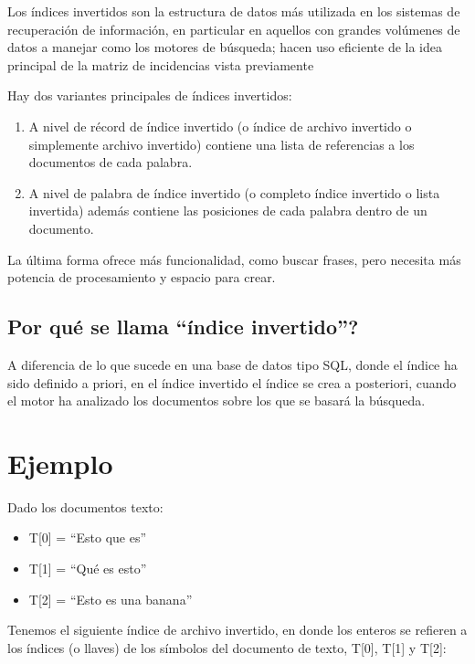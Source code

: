 \documentclass{article}
\begin{document}
Los índices invertidos son la estructura de datos más utilizada en los sistemas de recuperación de información, en particular en aquellos con grandes volúmenes de datos a manejar como los motores de búsqueda; hacen uso eficiente de la idea principal de la matriz de incidencias vista previamente
\newline

Hay dos variantes principales de índices invertidos: \cite{knuth1997art}

\begin{enumerate}
\item A nivel de récord de índice invertido ﻿(o ﻿índice de archivo invertido ﻿o simplemente ﻿archivo invertido﻿) contiene una lista de referencias a los documentos de cada palabra. 
\item A nivel de palabra de índice invertido ﻿(o ﻿completo índice invertido ﻿o ﻿lista invertida﻿) además contiene las posiciones de cada palabra dentro de un documento.  \cite{baeza1999modern}
\end{enumerate}
La última forma ofrece más funcionalidad, como buscar frases, pero necesita más potencia de procesamiento y espacio para crear. \cite{luk2007efficient}

\subsection{Por qué se llama ``índice invertido''?}
A diferencia de lo que sucede en una base de datos tipo SQL, donde el índice ha sido definido a priori, en el índice invertido el índice se crea a posteriori, cuando el motor ha analizado los documentos sobre los que se basará la búsqueda.

\section{Ejemplo}

Dado los documentos texto:

\begin{itemize}
\item T[0] = ``Esto que es''
\item T[1] = ``Qué es esto'' 
\item T[2] = ``Esto es una banana''
\end{itemize}

Tenemos el siguiente índice de archivo invertido, en donde los enteros se refieren a los índices (o llaves) de los símbolos del documento de texto, ﻿T[0], ﻿T[1] y T[2]:
\end{document}
